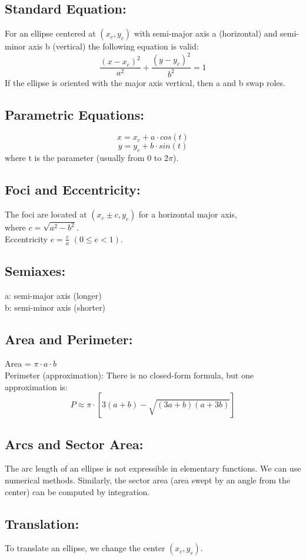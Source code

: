 \documentclass[a4paper,10pt]{article}
\begin{document}
\subsection{Standard Equation:}
For an ellipse centered at \((x_c, y_c)\) with semi-major axis a (horizontal) and semi-minor axis b (vertical) the following equation is valid:
      \[  \frac{(x - x_c)^2}{a^2} + \frac{(y - y_c)^2}{b^2} = 1 \]
    If the ellipse is oriented with the major axis vertical, then a and b swap roles.
\subsection{Parametric Equations:}
    \[ x = x_c + a \cdot cos(t) \]
    \[ y = y_c + b \cdot sin(t) \]
    where t is the parameter (usually from 0 to 2\(\pi\)).
\subsection{Foci and Eccentricity:}
    The foci are located at \((x_c \pm c, y_c)\) for a horizontal major axis,\\ where \(c = \sqrt{a^2 - b^2}\).\\
    Eccentricity \(e = \frac{c}{a}\,\,(0 \leq e < 1)\).\\
\subsection{Semiaxes:}
    a: semi-major axis (longer)\\
    b: semi-minor axis (shorter)\\
\subsection{Area and Perimeter:}
    Area = \( \pi \cdot a \cdot b \)\\
    Perimeter (approximation): There is no closed-form formula, but one approximation is:
       \[ P \approx \pi \cdot [ 3(a+b) - \sqrt{(3a+b)(a+3b)} ] \]
\subsection{Arcs and Sector Area:}
    The arc length of an ellipse is not expressible in elementary functions. We can use numerical methods.
    Similarly, the sector area (area swept by an angle from the center) can be computed by integration.
\subsection{Translation:}
    To translate an ellipse, we change the center \((x_c, y_c)\).
\end{document}
